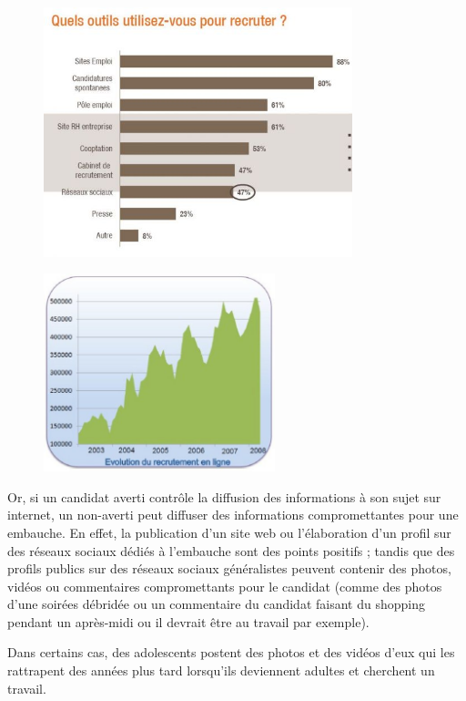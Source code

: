 \begin{figure}[H]
\center
\includegraphics[width=0.8\textwidth]{../resources/illustrations/recrutement-enquete}
\end{figure}
\begin{figure}[H]
\center
\includegraphics[width=0.6\textwidth]{../resources/illustrations/online_recrut}
\end{figure}

Or, si un candidat averti contrôle la diffusion des informations à son sujet sur internet, un non-averti peut diffuser des informations compromettantes pour une embauche. En effet, la publication d'un site web ou l'élaboration d'un profil sur des réseaux sociaux dédiés à l'embauche sont des points positifs ; tandis que des profils publics sur des réseaux sociaux généralistes peuvent contenir des photos, vidéos ou commentaires compromettants pour le candidat (comme des photos d'une soirées débridée ou un commentaire du candidat faisant du shopping pendant un après-midi ou il devrait être au travail par exemple).

Dans certains cas, des adolescents postent des photos et des vidéos d'eux qui les rattrapent des années plus tard lorsqu'ils deviennent adultes et cherchent un travail.


